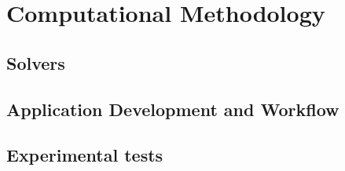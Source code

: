 
\chapter{Computational Methodology}
\label{chapter:computational_methodology}


\section{Solvers}
\label{section:solvers}

\section{Application Development and Workflow}
\label{section:development_workflow}

\section{Experimental tests}
\label{section:experimental_tests}	